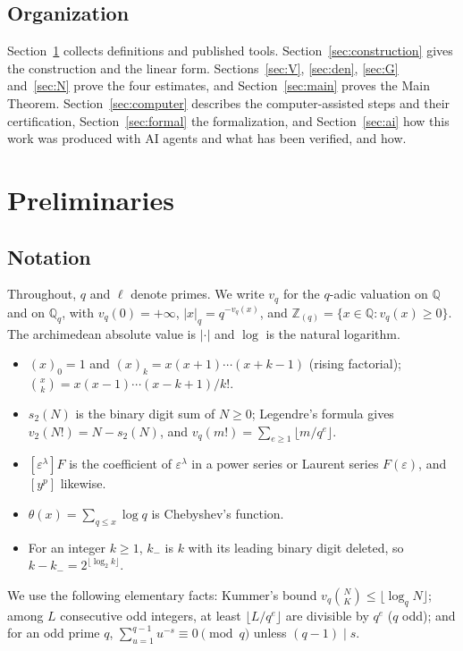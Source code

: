 \documentclass{amsart}
\theoremstyle{definition}
\theoremstyle{remark}
\numberwithin{equation}{section}
\newcommand{\Z}{\mathbb{Z}}
\newcommand{\Q}{\mathbb{Q}}
\begin{document}
\subsection{Organization}\label{ss:organization}

Section~\ref{sec:prelim} collects definitions and published tools.
Section~\ref{sec:construction} gives the construction and the linear form.
Sections~\ref{sec:V}, \ref{sec:den}, \ref{sec:G} and~\ref{sec:N} prove the
four estimates, and Section~\ref{sec:main} proves the Main Theorem.
Section~\ref{sec:computer} describes the computer-assisted steps and their
certification, Section~\ref{sec:formal} the formalization, and
Section~\ref{sec:ai} how this work was produced with AI agents and what has
been verified, and how.

\section{Preliminaries}\label{sec:prelim}

\subsection{Notation}\label{ss:notation}

Throughout, $q$ and $\ell$ denote primes. We write $v_q$ for the $q$-adic
valuation on $\Q$ and on $\Q_q$, with $v_q(0)=+\infty$, $|x|_q=q^{-v_q(x)}$,
and $\Z_{(q)}=\{x\in\Q:v_q(x)\ge0\}$. The archimedean absolute value is
$|\cdot|$ and $\log$ is the natural logarithm.
\begin{itemize}
\item $(x)_0=1$ and $(x)_k=x(x+1)\cdots(x+k-1)$ (rising factorial);
  $\binom{x}{k}=x(x-1)\cdots(x-k+1)/k!$.
\item $s_2(N)$ is the binary digit sum of $N\ge0$; Legendre's formula gives
  $v_2(N!)=N-s_2(N)$, and $v_q(m!)=\sum_{e\ge1}\lfloor m/q^e\rfloor$.
\item $[\varepsilon^\lambda]F$ is the coefficient of $\varepsilon^\lambda$ in a
  power series or Laurent series $F(\varepsilon)$, and $[y^p]$ likewise.
\item $\theta(x)=\sum_{q\le x}\log q$ is Chebyshev's function.
\item For an integer $k\ge1$, $k_-$ is $k$ with its leading binary digit
  deleted, so $k-k_-=2^{\lfloor\log_2k\rfloor}$.
\end{itemize}
We use the following elementary facts: Kummer's bound
$v_q\binom NK\le\lfloor\log_qN\rfloor$; among $L$ consecutive odd integers, at
least $\lfloor L/q^e\rfloor$ are divisible by $q^e$ ($q$ odd); and for an odd
prime $q$, $\sum_{u=1}^{q-1}u^{-s}\equiv0\pmod q$ unless $(q-1)\mid s$.
\end{document}
